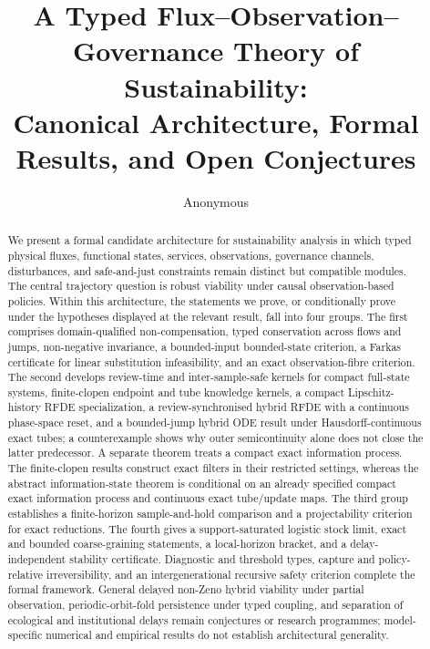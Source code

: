 \documentclass[11pt]{article}
\title{A Typed Flux--Observation--Governance Theory of Sustainability:\\
Canonical Architecture, Formal Results, and Open Conjectures}
\author{Anonymous}
\date{}
\theoremstyle{definition}
\begin{document}
\maketitle

\begin{abstract}
We present a formal candidate architecture for sustainability analysis in which typed physical fluxes, functional states, services, observations, governance channels, disturbances, and safe-and-just constraints remain distinct but compatible modules. The central trajectory question is robust viability under causal observation-based policies. Within this architecture, the statements we prove, or conditionally prove under the hypotheses displayed at the relevant result, fall into four groups. The first comprises domain-qualified non-compensation, typed conservation across flows and jumps, non-negative invariance, a bounded-input bounded-state criterion, a Farkas certificate for linear substitution infeasibility, and an exact observation-fibre criterion. The second develops review-time and inter-sample-safe kernels for compact full-state systems, finite-clopen endpoint and tube knowledge kernels, a compact Lipschitz-history RFDE specialization, a review-synchronised hybrid RFDE with a continuous phase-space reset, and a bounded-jump hybrid ODE result under Hausdorff-continuous exact tubes; a counterexample shows why outer semicontinuity alone does not close the latter predecessor. A separate theorem treats a compact exact information process. The finite-clopen results construct exact filters in their restricted settings, whereas the abstract information-state theorem is conditional on an already specified compact exact information process and continuous exact tube/update maps. The third group establishes a finite-horizon sample-and-hold comparison and a projectability criterion for exact reductions. The fourth gives a support-saturated logistic stock limit, exact and bounded coarse-graining statements, a local-horizon bracket, and a delay-independent stability certificate. Diagnostic and threshold types, capture and policy-relative irreversibility, and an intergenerational recursive safety criterion complete the formal framework. General delayed non-Zeno hybrid viability under partial observation, periodic-orbit-fold persistence under typed coupling, and separation of ecological and institutional delays remain conjectures or research programmes; model-specific numerical and empirical results do not establish architectural generality.
\end{abstract}
\end{document}
